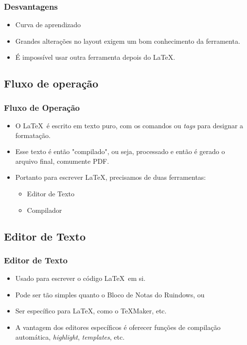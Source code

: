 \documentclass[10pt]{beamer}
\begin{document}
\begin{frame}
  \frametitle{Desvantagens}
  \begin{itemize}
    \item{Curva de aprendizado}
    \item{Grandes alterações no layout exigem um bom conhecimento da ferramenta.}
    \item{É impossível usar outra ferramenta depois do \LaTeX.}
  \end{itemize}
\end{frame}

\subsection{Fluxo de operação}
\begin{frame}
  \frametitle{Fluxo de Operação}
  \begin{itemize}
    \item O \LaTeX\ é escrito em texto puro, com os comandos ou \textit{tags} para designar a formatação.
    \item Esse texto é então "compilado", ou seja, processado e então é gerado o arquivo final, comumente PDF.
    \item Portanto para escrever \LaTeX, precisamos de duas ferramentas:
      \begin{itemize}
        \item Editor de Texto
        \item Compilador
      \end{itemize}
  \end{itemize}
\end{frame}

\subsection{Editor de Texto}
\begin{frame}
  \frametitle{Editor de Texto}
  \begin{itemize}
    \item Usado para escrever o código \LaTeX\ em si.
    \item Pode ser tão simples quanto o Bloco de Notas do Ruindows, ou
    \item Ser específico para \LaTeX, como o \TeX Maker, etc.
    \item A vantagem dos editores específicos é oferecer funções de compilação automática, \textit{highlight}, \textit{templates}, etc.
  \end{itemize}
\end{frame}
\end{document}

